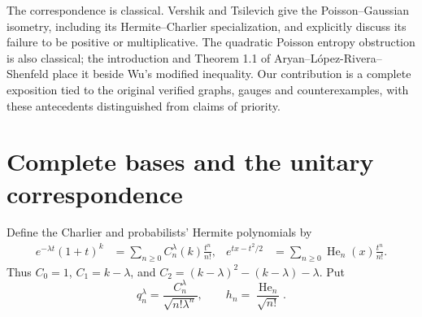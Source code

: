 \documentclass[11pt]{article}
\begin{document}
The correspondence is classical. Vershik and Tsilevich
\cite[Sections 1.3 and 3.1]{VT} give the Poisson--Gaussian isometry,
including its Hermite--Charlier specialization, and explicitly discuss
its failure to be positive or multiplicative. The quadratic Poisson
entropy obstruction is also classical; the introduction and Theorem 1.1
of Aryan--L\'opez-Rivera--Shenfeld \cite{ALRS} place it beside Wu's
modified inequality. Our contribution is a complete exposition tied to
the original verified graphs, gauges and counterexamples, with these
antecedents distinguished from claims of priority.

\section{Complete bases and the unitary correspondence}
Define the Charlier and probabilists' Hermite polynomials by
\begin{align}
 e^{-\lambda t}(1+t)^k&=\sum_{n\geq0} C_n^\lambda(k)\frac{t^n}{n!},
 & e^{tx-t^2/2}&=\sum_{n\geq0}\operatorname{He}_n(x)\frac{t^n}{n!}.
 \label{eq:generating}
\end{align}
Thus $C_0=1$, $C_1=k-\lambda$, and
$C_2=(k-\lambda)^2-(k-\lambda)-\lambda$. Put
\[
 q_n^\lambda=\frac{C_n^\lambda}{\sqrt{n!\lambda^n}},\qquad
 h_n=\frac{\operatorname{He}_n}{\sqrt{n!}}.
\]
\end{document}
